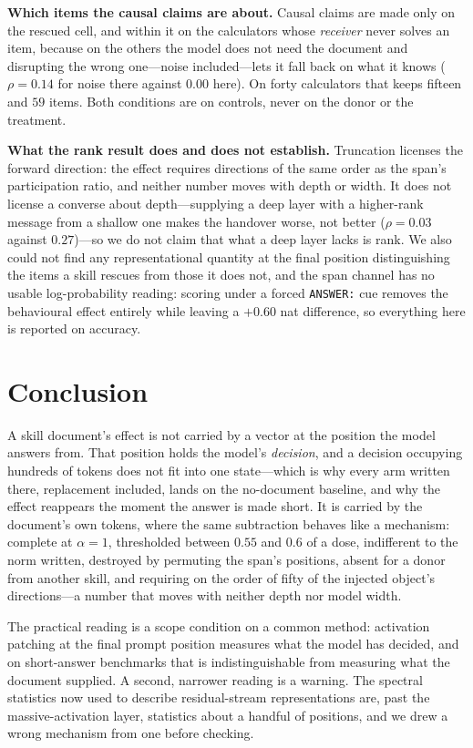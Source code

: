 \documentclass{article}
\begin{document}
\textbf{Which items the causal claims are about.} Causal claims are made only on
the rescued cell, and within it on the calculators whose \emph{receiver} never
solves an item, because on the others the model does not need the document and
disrupting the wrong one---noise included---lets it fall back on what it knows
($\rho=0.14$ for noise there against $0.00$ here). On forty calculators that
keeps fifteen and $59$ items. Both conditions are on controls, never on the
donor or the treatment.

\textbf{What the rank result does and does not establish.} Truncation licenses
the forward direction: the effect requires directions of the same order as the
span's participation ratio, and neither number moves with depth or width. It
does not license a converse about depth---supplying a deep layer with a
higher-rank message from a shallow one makes the handover worse, not better
($\rho=0.03$ against $0.27$)---so we do not claim that what a deep layer lacks
is rank. We also could not find any representational quantity at the final
position distinguishing the items a skill rescues from those it does not, and
the span channel has no usable log-probability reading: scoring under a forced
\texttt{ANSWER:} cue removes the behavioural effect entirely while leaving a
$+0.60$ nat difference, so everything here is reported on accuracy.

\section{Conclusion}

A skill document's effect is not carried by a vector at the position the model
answers from. That position holds the model's \emph{decision}, and a decision
occupying hundreds of tokens does not fit into one state---which is why every
arm written there, replacement included, lands on the no-document baseline, and
why the effect reappears the moment the answer is made short. It is carried by
the document's own tokens, where the same subtraction behaves like a mechanism:
complete at $\alpha=1$, thresholded between $0.55$ and $0.6$ of a dose,
indifferent to the norm written, destroyed by permuting the span's positions,
absent for a donor from another skill, and requiring on the order of fifty of
the injected object's directions---a number that moves with neither depth nor
model width.

The practical reading is a scope condition on a common method: activation
patching at the final prompt position measures what the model has decided, and
on short-answer benchmarks that is indistinguishable from measuring what the
document supplied. A second, narrower reading is a warning. The spectral
statistics now used to describe residual-stream representations are, past the
massive-activation layer, statistics about a handful of positions, and we drew a
wrong mechanism from one before checking.
\end{document}

